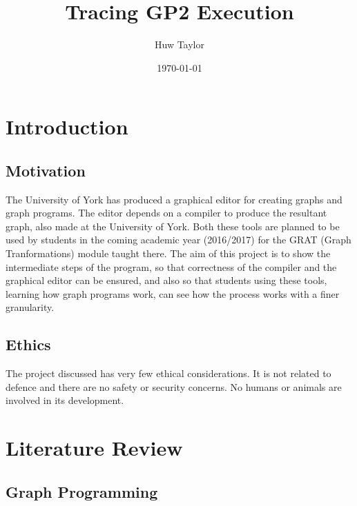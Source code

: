 \documentclass{UoYCSproject}
\author{Huw Taylor}
\title{Tracing GP2 Execution} %
\date{\today}
\begin{document}
\maketitle
\tableofcontents

\chapter{Introduction}
\section{Motivation}
The University of York has produced a graphical editor for creating graphs and graph programs. The editor depends on a compiler to produce the resultant graph, also made at the University of York. Both these tools are planned to be used by students in the coming academic year (2016/2017) for the GRAT (Graph Tranformations) module taught there.
The aim of this project is to show the intermediate steps of the program, so that correctness of the compiler and the graphical editor can be ensured, and also so that students using these tools, learning how graph programs work, can see how the process works with a finer granularity.
\section{Ethics}
The project discussed has very few ethical considerations. It is not related to defence and there are no safety or security concerns. No humans or animals are involved in its development.

\chapter{Literature Review}
\section{Graph Programming}
\end{document}
